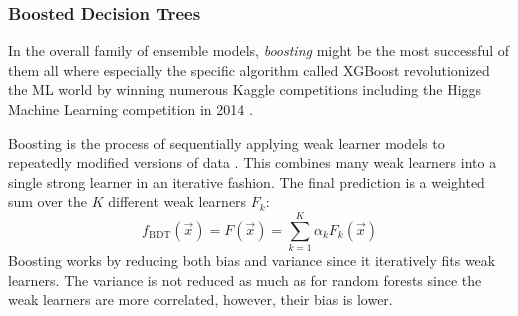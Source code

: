 

\subsubsection{Boosted Decision Trees}
\label{subsubsec:ml:boosted_decision_trees}
In the overall family of ensemble models, \emph{boosting} might be the most successful of them all where especially the specific algorithm called XGBoost \autocite{chenXGBoostScalableTree2016} revolutionized the ML world by winning numerous Kaggle competitions \autocite{DmlcXgboost} including the Higgs Machine Learning competition in \num{2014} \autocite{HEPMeetsML}. 

Boosting is the process of sequentially applying weak learner models to repeatedly modified versions of data \autocite{hastieElementsStatisticalLearning2009}. This combines many weak learners into a single strong learner in an iterative fashion. The final prediction is a weighted sum over the $K$ different weak learners $F_k$: 
\begin{equation}
  f_\mathrm{BDT}(\vec{x}) = F(\vec{x}) = \sum_{k=1}^K \alpha_k F_k(\vec{x})
\end{equation}
Boosting works by reducing both bias and variance since it iteratively fits weak learners. The variance is not reduced as much as for random forests since the weak learners are more correlated, however, their bias is lower. 

